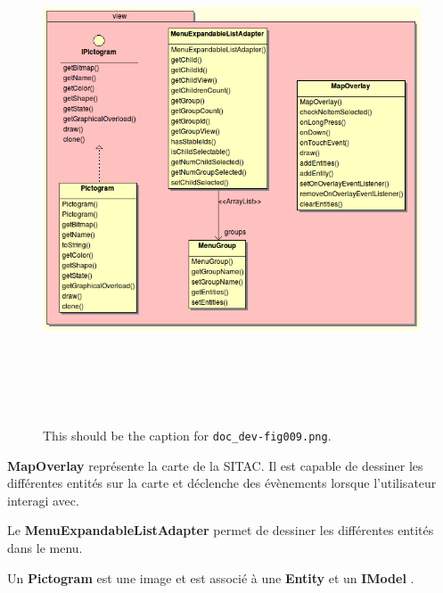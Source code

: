 \documentclass{article}
\begin{document}
\begin{figure}[htbp]
\begin{center}
\includegraphics[width=499pt, height=427pt]{doc_dev-fig009.png}
\caption{This should be the caption for \texttt{doc\_dev-fig009.png}.}
\end{center}
\end{figure}

\vspace{13pt}
{\color{color01} \textbf{MapOverlay}}{\color{color01}  représente la carte de 
la SITAC. Il est capable de dessiner les différentes entités sur la carte et 
déclenche des évènements lorsque l'utilisateur interagi avec.}

{\color{color01} Le }{\color{color01} \textbf{MenuExpandableListAdapter}}{\color{color01}  
permet de dessiner les différentes entités dans le menu.}

{\color{color01} Un }{\color{color01} \textbf{Pictogram}}{\color{color01}  est 
une image et est associé à une }{\color{color01} \textbf{Entity}}{\color{color01}  
et un }{\color{color01} \textbf{IModel}}{\color{color01} .}
\end{document}
